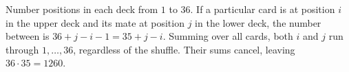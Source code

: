 Number positions in each deck from $1$ to $36$. If a particular card is at position $i$ in the upper deck and its mate at position $j$ in the lower deck, the number between is $36+j-i-1=35+j-i$. Summing over all cards, both $i$ and $j$ run through $1,\ldots,36$, regardless of the shuffle. Their sums cancel, leaving $36\cdot 35=\boxed{1260}$.
